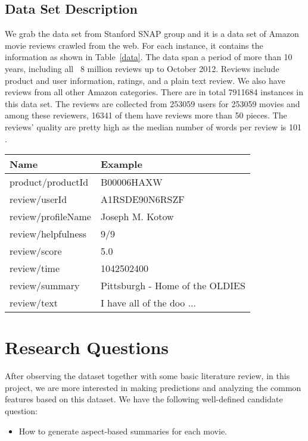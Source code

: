 \documentclass[12pt]{article}
\begin{document}
\subsection{Data Set Description}
We grab the data set from Stanford SNAP group and it is a data set of Amazon movie reviews crawled from the
web. For each instance, it contains the information as shown in Table~\ref{data}.  The data span a period 
of more than 10 years, including all ~8 million reviews up to October 2012. Reviews include product and 
user information, ratings, and a plain text review. We also have reviews from all other Amazon categories. 
There are in total 7911684 instances in this data set. The reviews are collected from 253059 users for 253059 
movies and among these reviewers, 16341 of them have reviews more than 50 pieces. The reviews' quality are 
pretty high as the median number of words per review is 101 \cite{mcauley2013amateurs}.

\begin{table*}[!htbp]
\centering
\caption{Dataset}\label{data}
\begin{tabular}{ll}
\hline
\hline
Name&Example\\
 \hline
product/productId& B00006HAXW\\
review/userId& A1RSDE90N6RSZF\\
review/profileName& Joseph M. Kotow\\
review/helpfulness& 9/9\\
review/score& 5.0\\
review/time& 1042502400\\
review/summary& Pittsburgh - Home of the OLDIES\\
review/text& I have all of the doo ...\\
\hline
\hline
\end{tabular}
\end{table*}


\section{Research Questions}
After observing the dataset together with some basic literature review, in this project, we are more interested in making predictions and analyzing the common features based on this dataset. We have the following  well-defined candidate question:
\begin{itemize}
\item How to generate aspect-based summaries for each movie.
\end{itemize}
\end{document}
